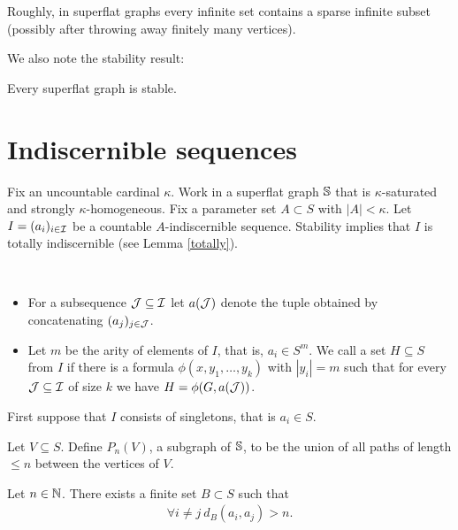 Roughly, in superflat graphs every infinite set contains a sparse infinite subset (possibly after throwing away finitely many vertices).

We also note the stability result:
\begin{Theorem} 
  Every superflat graph is stable.
\end{Theorem}

\section{Indiscernible sequences}

Fix an uncountable cardinal $\kappa$.
Work in a superflat graph $\mathbb S$ that is $\kappa$-saturated and strongly $\kappa$-homogeneous.
Fix a parameter set $A \subset S$ with $|A| < \kappa$.
Let $I = (a_i)_{i \in \operatorname{\mathcal I}}$ be a countable $A$-indiscernible sequence.
Stability implies that $I$ is totally indiscernible (see Lemma \ref{totally}).

\begin{Definition} \ 
  \begin{itemize}
  \item For a subsequence $\operatorname{\mathcal J} \subseteq \operatorname{\mathcal I}$ let $a(\operatorname{\mathcal J})$ denote the tuple obtained by concatenating $(a_j)_{j \in \operatorname{\mathcal J}}$.
  \item Let $m$ be the arity of elements of $I$, that is, $a_i \in S^m$.
    We call a set $H \subseteq S$ \defn{uniformly definable} from $I$ if there
    is a formula $\phi(x, y_1, \ldots, y_k)$ with $|y_i| = m$
    such that for every $\operatorname{\mathcal J} \subseteq \operatorname{\mathcal I}$ of size $k$ we have $H = \phi(G, a(\operatorname{\mathcal J}))$.
  \end{itemize}
\end{Definition}

First suppose that $I$ consists of singletons, that is $a_i \in S$.

\begin{Definition}
  Let $V \subseteq S$. Define $P_n(V)$, a subgraph of $\mathbb S$, to be the union of all paths of length $\leq n$ between the vertices of $V$.
\end{Definition}

\begin{Lemma} \label{lm_bump}
  Let $n \in \mathbb{N}$.
  There exists a finite set $B \subset S$ such that
  \begin{align*}
    \forall i \neq j \ d_B(a_i, a_j) > n.
  \end{align*}
\end{Lemma}

